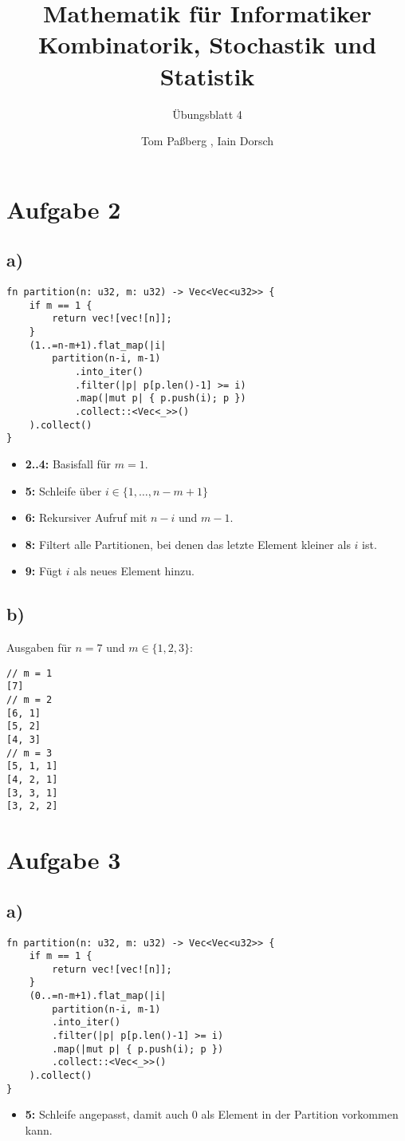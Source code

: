 \documentclass[a4paper]{scrartcl}
\title{Mathematik für Informatiker \\ Kombinatorik, Stochastik und Statistik}
\subtitle{Übungsblatt 4}
\author{Tom Paßberg , Iain Dorsch}
\date{}
\begin{document}
\maketitle

\newpage

\section*{Aufgabe 2}
\subsection*{a)}
\begin{lstlisting}
fn partition(n: u32, m: u32) -> Vec<Vec<u32>> {
	if m == 1 {
		return vec![vec![n]];
	}
	(1..=n-m+1).flat_map(|i| 
		partition(n-i, m-1)
			.into_iter()
			.filter(|p| p[p.len()-1] >= i)
			.map(|mut p| { p.push(i); p })
			.collect::<Vec<_>>()
	).collect()
}
\end{lstlisting}
\begin{itemize}
	\item \textbf{2..4:} Basisfall für $m = 1$.
	\item \textbf{5:} Schleife über $ i \in \{ 1,\ldots, n-m+1\} $
	\item \textbf{6:} Rekursiver Aufruf mit $n-i$ und $m-1$.
	\item \textbf{8:} Filtert alle Partitionen, bei denen das letzte Element kleiner als $i$ ist.
	\item \textbf{9:} Fügt $i$ als neues Element hinzu.
\end{itemize}
\subsection*{b)}
Ausgaben für $n = 7$ und $m \in \{1,2,3\}$:

\begin{lstlisting}
// m = 1
[7]
// m = 2
[6, 1]
[5, 2]
[4, 3]
// m = 3
[5, 1, 1]
[4, 2, 1]
[3, 3, 1]
[3, 2, 2]
\end{lstlisting}

\newpage
\section*{Aufgabe 3}
\subsection*{a)}
\begin{lstlisting}
fn partition(n: u32, m: u32) -> Vec<Vec<u32>> {
	if m == 1 {
		return vec![vec![n]];
	}
	(0..=n-m+1).flat_map(|i| 
		partition(n-i, m-1)
		.into_iter()
		.filter(|p| p[p.len()-1] >= i)
		.map(|mut p| { p.push(i); p })
		.collect::<Vec<_>>()
	).collect()
}
\end{lstlisting}
\begin{itemize}
	\item \textbf{5:} Schleife angepasst, damit auch $0$ als Element in der Partition vorkommen kann.
\end{itemize}
\end{document}

